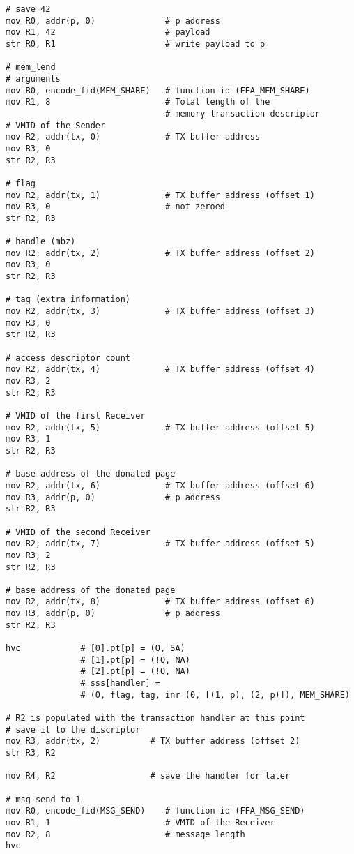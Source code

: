 \documentclass{article}
\begin{document}
\clearpage

\begin{lstlisting}[caption={VM 0}]
# save 42
mov R0, addr(p, 0)              # p address
mov R1, 42                      # payload
str R0, R1                      # write payload to p

# mem_lend
# arguments
mov R0, encode_fid(MEM_SHARE)   # function id (FFA_MEM_SHARE)
mov R1, 8                       # Total length of the  
                                # memory transaction descriptor
# VMID of the Sender 
mov R2, addr(tx, 0)             # TX buffer address                               
mov R3, 0
str R2, R3

# flag
mov R2, addr(tx, 1)             # TX buffer address (offset 1)                               
mov R3, 0                       # not zeroed
str R2, R3

# handle (mbz)
mov R2, addr(tx, 2)             # TX buffer address (offset 2)
mov R3, 0
str R2, R3

# tag (extra information)
mov R2, addr(tx, 3)             # TX buffer address (offset 3)
mov R3, 0
str R2, R3

# access descriptor count
mov R2, addr(tx, 4)             # TX buffer address (offset 4)
mov R3, 2
str R2, R3

# VMID of the first Receiver
mov R2, addr(tx, 5)             # TX buffer address (offset 5)
mov R3, 1
str R2, R3

# base address of the donated page
mov R2, addr(tx, 6)             # TX buffer address (offset 6)
mov R3, addr(p, 0)              # p address
str R2, R3

# VMID of the second Receiver
mov R2, addr(tx, 7)             # TX buffer address (offset 5)
mov R3, 2
str R2, R3

# base address of the donated page
mov R2, addr(tx, 8)             # TX buffer address (offset 6)
mov R3, addr(p, 0)              # p address
str R2, R3

hvc            # [0].pt[p] = (O, SA)
               # [1].pt[p] = (!O, NA)
               # [2].pt[p] = (!O, NA)
               # sss[handler] = 
               # (0, flag, tag, inr (0, [(1, p), (2, p)]), MEM_SHARE)

# R2 is populated with the transaction handler at this point
# save it to the discriptor
mov R3, addr(tx, 2)          # TX buffer address (offset 2)
str R3, R2

mov R4, R2                   # save the handler for later

# msg_send to 1
mov R0, encode_fid(MSG_SEND)    # function id (FFA_MSG_SEND)
mov R1, 1                       # VMID of the Receiver
mov R2, 8                       # message length
hvc


\end{lstlisting}
\end{document}
